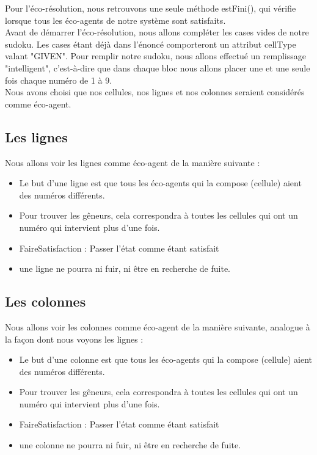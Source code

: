 	Pour l'éco-résolution, nous retrouvons une seule méthode estFini(), qui vérifie lorsque tous les éco-agents de notre système sont satisfaits. \\
	Avant de démarrer l'éco-résolution, nous allons compléter les cases vides de notre sudoku. Les cases étant déjà dans l'énoncé comporteront un attribut cellType valant "GIVEN". Pour remplir notre sudoku, nous allons effectué un remplissage "intelligent", c'est-à-dire que dans chaque bloc nous allons placer une et une seule fois chaque numéro de 1 à 9.\\
	Nous avons choisi que nos cellules, nos lignes et nos colonnes seraient considérés comme éco-agent. \\
	
	\subsection{Les lignes}
	Nous allons voir les lignes comme éco-agent de la manière suivante : \\
	\begin{itemize}
	\item Le but d'une ligne est que tous les éco-agents qui la compose (cellule) aient des numéros différents.
	\item Pour trouver les gêneurs, cela correspondra à toutes les cellules qui ont un numéro qui intervient plus d'une fois. 
	\item FaireSatisfaction : Passer l'état comme étant satisfait
	\item une ligne ne pourra ni fuir, ni être en recherche de fuite.   
	\end{itemize}
	
	\subsection{Les colonnes}
	Nous allons voir les colonnes comme éco-agent de la manière suivante, analogue à la façon dont nous voyons les lignes : \\
	\begin{itemize}
	\item Le but d'une colonne est que tous les éco-agents qui la compose (cellule) aient des numéros différents.
	\item Pour trouver les gêneurs, cela correspondra à toutes les cellules qui ont un numéro qui intervient plus d'une fois. 
	\item FaireSatisfaction : Passer l'état comme étant satisfait
	\item une colonne ne pourra ni fuir, ni être en recherche de fuite.   
	\end{itemize}
	
